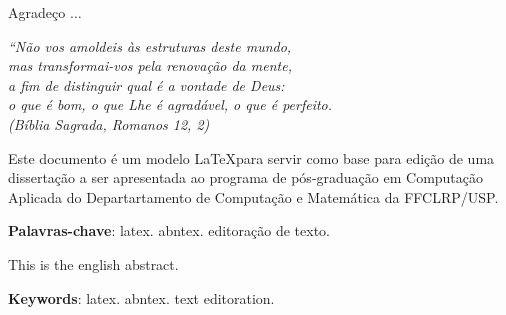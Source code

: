 \documentclass[
12pt,        %
openright,   %
twoside,     %
a4paper,     %
english,       %
brazil        %
%
%
]{ppgca}
\begin{document}
\begin{agradecimentos}
Agradeço $\ldots$
\end{agradecimentos}

\begin{epigrafe}
    \vspace*{\fill}
        \begin{flushright}
                \textit{``Não vos amoldeis às estruturas deste mundo, \\
                mas transformai-vos pela renovação da mente, \\
                a fim de distinguir qual é a vontade de Deus: \\
                o que é bom, o que Lhe é agradável, o que é perfeito.\\
                (Bíblia Sagrada, Romanos 12, 2)}
        \end{flushright}
\end{epigrafe}


\setlength{\absparsep}{18pt} %
\begin{resumo}
  Este documento é um modelo \LaTeX para servir como base para edição
  de uma dissertação a ser apresentada ao programa de pós-graduação em
  Computação Aplicada do Departartamento de Computação e Matemática da
  FFCLRP/USP.

\noindent \textbf{Palavras-chave}: latex. abntex. editoração de texto.
\end{resumo}

\begin{resumo}[Abstract]
   This is the english abstract.

   \vspace{\onelineskip}

   \noindent \textbf{Keywords}: latex. abntex. text editoration.
\end{resumo}


\listoffigures*
\cleardoublepage
\end{document}
